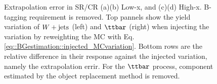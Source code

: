 \begin{figure}[h]
  \centering

 \caption{Extrapolation error in SR/CR (a)(b) Low-x, and (c)(d) High-x. B-tagging requirement is removed. Top pannels show the yield variation of $W+\mathrm{jets}$ (left) and $\ttbar$ (right) when injecting the variation by reweighting the MC with Eq. \ref{eq::BGestimation::injected_MCvariation}. Bottom rows are the relative difference in their response against the injected variation, namely the extrapolation errir. For the $\ttbar$ process, component estimated by the object replacement method is removed.  \label{fig::BGestimation::valid_extp_6J} }
\end{figure}


